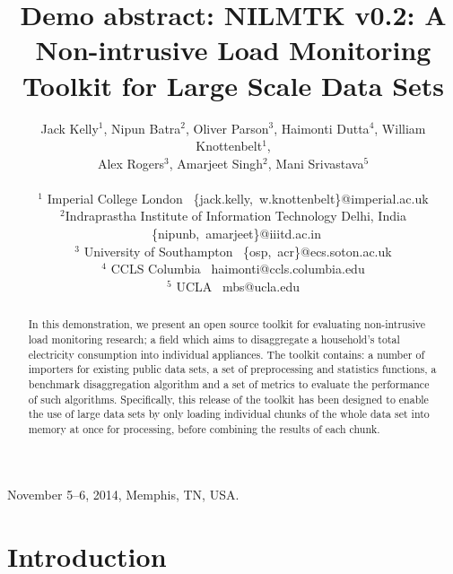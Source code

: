 \documentclass[10pt,abstract]{sensys-proc}
\begin{document}
\title{Demo abstract: NILMTK v0.2: A Non-intrusive Load Monitoring Toolkit for Large Scale Data Sets}


 \author{Jack Kelly$^1$, Nipun Batra$^2$, Oliver Parson$^3$, Haimonti Dutta$^4$, William Knottenbelt$^1$,\\ Alex Rogers$^3$, Amarjeet Singh$^2$, Mani Srivastava$^5$\\ \\
\small $^1$ Imperial College London ~\{jack.kelly,~w.knottenbelt\}@imperial.ac.uk\\
\small $^2$Indraprastha Institute of Information Technology Delhi, India ~\{nipunb,~amarjeet\}@iiitd.ac.in\\
\small $^3$ University of Southampton ~\{osp,~acr\}@ecs.soton.ac.uk\\
\small $^4$ CCLS Columbia ~haimonti@ccls.columbia.edu\\
\small $^5$ UCLA ~mbs@ucla.edu\\
}

 {November 5--6, 2014, Memphis, TN, USA.}



\maketitle

\begin{abstract}
In this demonstration, we present an open source toolkit for evaluating non-intrusive load monitoring research; a field which aims to disaggregate a household's total electricity consumption into individual appliances. The toolkit contains: a number of importers for existing public data sets, a set of preprocessing and statistics functions, a benchmark disaggregation algorithm and a set of metrics to evaluate the performance of such algorithms. Specifically, this release of the toolkit has been designed to enable the use of large data sets by only loading individual chunks of the whole data set into memory at once for processing, before combining the results of each chunk.
\end{abstract}





\section{Introduction}
\end{document}
